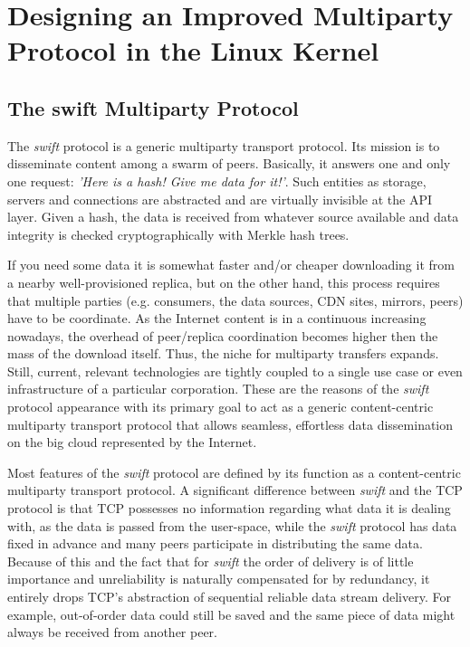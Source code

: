 
\chapter{Designing an Improved Multiparty Protocol in the Linux Kernel}
\label{chapter:multiparty}


\section{The swift Multiparty Protocol}
\label{sec:multiparty:swift}

The \textit{swift} protocol is a generic multiparty transport protocol. Its
mission is to disseminate content among a swarm of peers. Basically, it
answers one and only one request: \textit{'Here is a hash! Give me data for
it!'}. Such entities as storage, servers and connections are abstracted and
are virtually invisible at the API layer. Given a hash, the data is received
from whatever source available and data integrity is checked cryptographically
with Merkle hash trees.


If you need some data it is somewhat faster and/or cheaper downloading it from
a nearby well-provisioned replica, but on the other hand, this process
requires that multiple parties (e.g. consumers, the data sources, CDN
sites, mirrors, peers) have to be coordinate. As the Internet
content is in a continuous increasing nowadays, the overhead of peer/replica
coordination becomes higher then the mass of the download itself. Thus, the
niche for multiparty transfers expands. Still, current, relevant technologies
are tightly coupled to a single use case or even infrastructure of a
particular corporation. These are the reasons of the \textit{swift} protocol
appearance with its primary goal to act as a generic content-centric
multiparty transport protocol that allows seamless, effortless data
dissemination on the big cloud represented by the Internet.

Most features of the \textit{swift} protocol are defined by its function as a
content-centric multiparty transport protocol. A significant difference
between \textit{swift} and the TCP protocol is that TCP possesses no
information regarding what data it is dealing with, as the data is passed from
the user-space, while the \textit{swift} protocol has data fixed in advance
and many peers participate in distributing the same data. Because of this and
the fact that for \textit{swift} the order of delivery is of little importance
and unreliability is naturally compensated for by redundancy, it entirely
drops TCP's abstraction of sequential reliable data stream delivery. For
example, out-of-order data could still be saved and the same piece of data
might always be received from another peer.

